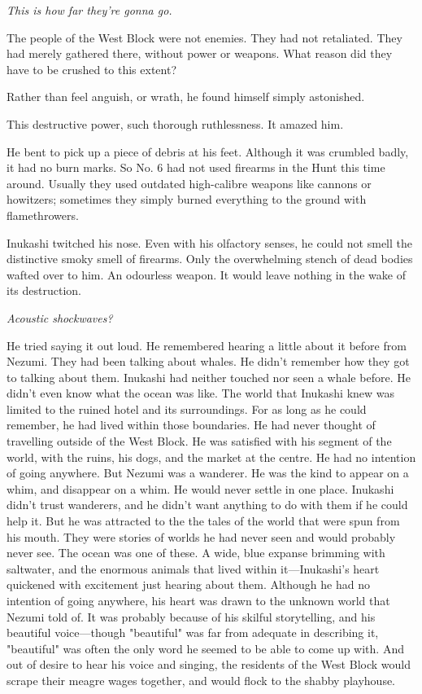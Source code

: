 \emph{This is how far they're gonna go.}

The people of the West Block were not enemies. They had not retaliated.
They had merely gathered there, without power or weapons. What reason
did they have to be crushed to this extent?

Rather than feel anguish, or wrath, he found himself simply astonished.

This destructive power, such thorough ruthlessness. It amazed him.

He bent to pick up a piece of debris at his feet. Although it was
crumbled badly, it had no burn marks. So No. 6 had not used firearms in
the Hunt this time around. Usually they used outdated high-calibre
weapons like cannons or howitzers; sometimes they simply burned
everything to the ground with flamethrowers.

Inukashi twitched his nose. Even with his olfactory senses, he could not
smell the distinctive smoky smell of firearms. Only the overwhelming
stench of dead bodies wafted over to him. An odourless weapon. It would
leave nothing in the wake of its destruction.

\emph{Acoustic shockwaves?}

He tried saying it out loud. He remembered hearing a little about it
before from Nezumi. They had been talking about whales. He didn't
remember how they got to talking about them. Inukashi had neither
touched nor seen a whale before. He didn't even know what the ocean was
like. The world that Inukashi knew was limited to the ruined hotel and
its surroundings. For as long as he could remember, he had lived within
those boundaries. He had never thought of travelling outside of the West
Block. He was satisfied with his segment of the world, with the ruins,
his dogs, and the market at the centre. He had no intention of going
anywhere. But Nezumi was a wanderer. He was the kind to appear on a
whim, and disappear on a whim. He would never settle in one place.
Inukashi didn't trust wanderers, and he didn't want anything to do with
them if he could help it. But he was attracted to the the tales of the
world that were spun from his mouth. They were stories of worlds he had
never seen and would probably never see. The ocean was one of these. A
wide, blue expanse brimming with saltwater, and the enormous animals
that lived within it---Inukashi's heart quickened with excitement just
hearing about them. Although he had no intention of going anywhere, his
heart was drawn to the unknown world that Nezumi told of. It was
probably because of his skilful storytelling, and his beautiful
voice---though "beautiful" was far from adequate in describing it,
"beautiful" was often the only word he seemed to be able to come up
with. And out of desire to hear his voice and singing, the residents of
the West Block would scrape their meagre wages together, and would flock
to the shabby playhouse.

